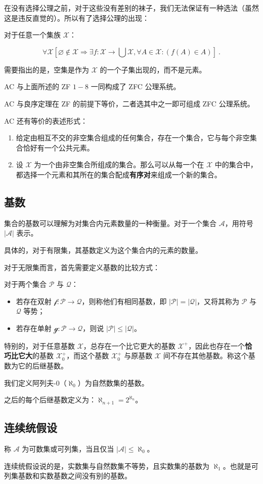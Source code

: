 在没有选择公理之前，对于这些没有差别的袜子，我们无法保证有一种选法（虽然这是违反直觉的）。所以有了选择公理的出现：

对于任意一个集族 $\mathscr X$：

$$\forall \mathscr X \left[\varnothing \not \in \mathscr X \Rightarrow \exists f: \mathscr X \rightarrow \bigcup \mathscr X, \forall A \in \mathscr X: \left(f(A) \in A\right)\right] ~.$$

需要指出的是，空集是作为 $\mathscr X$ 的一个子集出现的，而不是元素。


AC 与上面所述的 ZF $1-8$ 一同构成了 ZFC 公理系统。

AC 与良序定理在 ZF 的前提下等价，二者选其中之一即可组成 ZFC 公理系统。

AC 还有等价的表述形式：

\begin{enumerate}
\item 给定由相互不交的非空集合组成的任何集合，存在一个集合，它与每个非空集合恰好有一个公共元素。
\item 设 $\mathscr X$ 为一个由非空集合所组成的集合。那么可以从每一个在 $\mathscr X$ 中的集合中，都选择一个元素和其所在的集合配成\textbf{有序对}来组成一个新的集合。
\end{enumerate}

\subsection{基数}
集合的基数可以理解为对集合内元素数量的一种衡量。对于一个集合 $\mathscr A$，用符号 $\left|\mathscr A\right|$ 表示。

具体的，对于有限集，其基数定义为这个集合内的元素的数量。

对于无限集而言，首先需要定义基数的比较方式：

对于两个集合 $\mathscr P$ 与 $\mathscr Q$：
\begin{itemize}
\item 若存在双射 $\mathscr f: \mathscr P \rightarrow \mathscr Q$，则称他们有相同基数，即 $|\mathscr P| = |\mathscr Q|$，又将其称为 $\mathscr P$ 与 $\mathscr Q$ 等势；
\item 若存在单射 $\mathscr g: \mathscr P \rightarrow \mathscr Q$，则说 $|\mathscr P| \le |\mathscr Q|$。
\end{itemize}

特别的，对于任意基数 $\mathscr X$，总存在一个比它更大的基数 $\mathscr X^+$，因此也存在一个\textbf{恰巧比它大}的基数 $\mathscr X^+_0$，而这个基数 $\mathscr X^+_0$ 与原基数 $\mathscr X$ 间不存在其他基数。称这个基数为它的后继基数。

我们定义阿列夫-0（$\aleph_0$）为自然数集的基数。

之后的每个后继基数定义为：$\aleph_{n+1}=2^{\aleph_n}$。


\subsection{连续统假设}
称 $\mathscr A$ 为可数集或可列集，当且仅当 $|\mathscr A| \le \aleph_0$。

连续统假设说的是，实数集与自然数集不等势，且实数集的基数为 $\aleph_1$。也就是可列集基数和实数基数之间没有别的基数。
